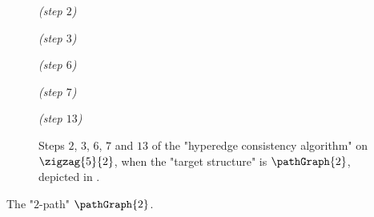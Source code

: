 \begin{figure}
	\centering
	\begin{tikzpicture}
		
		
	\end{tikzpicture}
	\quad\emph{(step $2$)~}\\[2em]
	\begin{tikzpicture}
		
		
	\end{tikzpicture}
	\quad\emph{(step $3$)~}\\[2em]
	\begin{tikzpicture}
		
		
	\end{tikzpicture}
	\quad\emph{(step $6$)~}\\[2em]
	\begin{tikzpicture}
		
		
	\end{tikzpicture}
	\quad\emph{(step $7$)~}\\[2em]
	\begin{tikzpicture}
		
		
	\end{tikzpicture}
	\quad\emph{(step $13$)}
	\caption{%
		\AP\label{fig:zigzag-graph-HC-P2}
		Steps $2$, $3$, $6$, $7$ and $13$ of the "hyperedge consistency algorithm"
		on $\zigzag{5}{2}$,
		when the "target structure" is $\pathGraph{2}$, depicted in .%
	}
\end{figure}
\begin{marginfigure}[-9.5em]
	\centering
	\begin{tikzpicture}
		
	\end{tikzpicture}
	\caption{
		\AP\label{fig:zigzag-graph-HC-P2-side-P2}
		The "$2$-path" $\pathGraph{2}$.
	}
\end{marginfigure}
